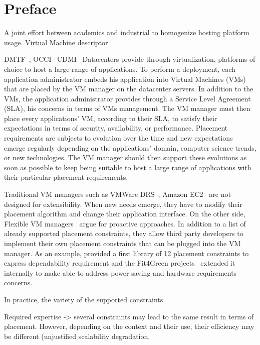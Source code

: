 \chapter{Preface}

A joint effort between academics and industrial to homogenize hosting platform usage.
Virtual Machine descriptor~\cite{OVF}

DMTF~\cite{DMTF}, 
OCCI~\cite{OCCI}
CDMI~\cite{CDMI}
Datacenters provide through virtualization, platforms of choice to host a large range
of applications.
%
To perform a deployment, each application administrator embeds his application into
Virtual Machines (VMs) that are placed by the VM manager on the datacenter servers.
In addition to the VMs, the application administrator provides through a Service
Level Agreement (SLA), his concerns in terms of VMs management. 
The VM manager must then place every applications' VM, according
to their SLA, to satisfy their  expectations in terms of security, availability, or performance.
%
Placement requirements are subjects to evolution over the time and new expectations
emerge regularly depending on the applications' domain, computer science trends, or new technologies.
%
The VM manager should then support these evolutions as soon as possible to keep
being suitable to host a large range of applications with their particular placement requirements.

Traditional VM managers such as VMWare DRS~\cite{DRS}, Amazon EC2~\cite{amazon} are not
designed for extensibility.
When new needs emerge, they have to modify their placement algorithm and change their application
interface.
On the other side, Flexible VM managers~\cite{bin-icdcs2011,harper-dcdv2011,hermenier-cp2011,cope-socc2011} argue for proactive approaches. In addition to a list of already supported
placement constraints, they allow third party developers to implement their own placement constraints
that can be plugged into the VM manager.
%
As an example, {\btrp} provided a first library of 12 placement constraints to express dependability
requirement and the Fit4Green projects~\cite{f4g} extended it internally to make {\btrp} able to
address power saving and hardware requirements concerns.

In practice, the variety of the supported constraints 

Required expertise
-> several constraints may lead to the same result in terms of placement. However, depending
on the context and their use, their efficiency may be different (unjustified scalability degradation,

